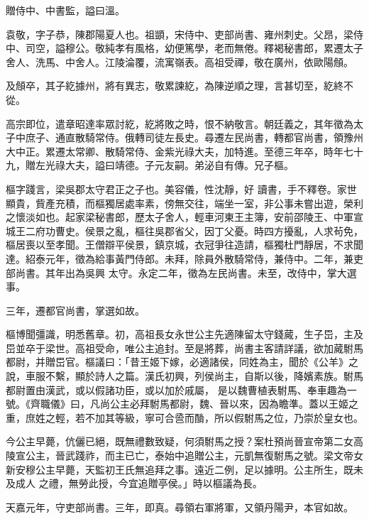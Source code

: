 \begin{pinyinscope}
 贈侍中、中書監，謚曰溫。



 袁敬，字子恭，陳郡陽夏人也。祖顗，宋侍中、吏部尚書、雍州刺史。父昂，梁侍中、司空，謚穆公。敬純孝有風格，幼便篤學，老而無倦。釋褐秘書郎，累遷太子舍人、洗馬、中舍人。江陵淪覆，流寓嶺表。高祖受禪，敬在廣州，依歐陽頠。



 及頠卒，其子紇據州，將有異志，敬累諫紇，為陳逆順之理，言甚切至，紇終不從。



 高宗即位，遣章昭達率眾討紇，紇將敗之時，恨不納敬言。朝廷義之，其年徵為太子中庶子、通直散騎常侍。俄轉司徒左長史。尋遷左民尚書，轉都官尚書，領豫州大中正。累遷太常卿、散騎常侍、金紫光祿大夫，加特進。至德三年卒，時年七十九，贈左光祿大夫，謚曰靖德。子元友嗣。弟泌自有傳。兄子樞。



 樞字踐言，梁吳郡太守君正之子也。美容儀，性沈靜，好
 讀書，手不釋卷。家世顯貴，貲產充積，而樞獨居處率素，傍無交往，端坐一室，非公事未嘗出遊，榮利之懷淡如也。起家梁秘書郎，歷太子舍人，輕車河東王主簿，安前邵陵王、中軍宣城王二府功曹史。侯景之亂，樞往吳郡省父，因丁父憂。時四方擾亂，人求茍免，樞居喪以至孝聞。王僧辯平侯景，鎮京城，衣冠爭往造請，樞獨杜門靜居，不求聞達。紹泰元年，徵為給事黃門侍郎。未拜，除員外散騎常侍，兼侍中。二年，兼吏部尚書。其年出為吳興
 太守。永定二年，徵為左民尚書。未至，改侍中，掌大選事。



 三年，遷都官尚書，掌選如故。



 樞博聞彊識，明悉舊章。初，高祖長女永世公主先適陳留太守錢蕆，生子岊，主及岊並卒于梁世。高祖受命，唯公主追封。至是將葬，尚書主客請詳議，欲加蕆駙馬都尉，并贈岊官。樞議曰：「昔王姬下嫁，必適諸侯，同姓為主，聞於《公羊》之說，車服不繫，顯於詩人之篇。漢氏初興，列侯尚主，自斯以後，降嬪素族。駙馬都尉置由漢武，或以假諸功臣，或以加於戚屬，
 是以魏曹植表駙馬、奉車趣為一號。《齊職儀》曰，凡尚公主必拜駙馬都尉，魏、晉以來，因為瞻準。蓋以王姬之重，庶姓之輕，若不加其等級，寧可合巹而酳，所以假駙馬之位，乃崇於皇女也。



 今公主早薨，伉儷已絕，既無禮數致疑，何須駙馬之授？案杜預尚晉宣帝第二女高陵宣公主，晉武踐祚，而主已亡，泰始中追贈公主，元凱無復駙馬之號。梁文帝女新安穆公主早薨，天監初王氏無追拜之事。遠近二例，足以據明。公主所生，既未及成人
 之禮，無勞此授，今宜追贈亭侯。」時以樞議為長。



 天嘉元年，守吏部尚書。三年，即真。尋領右軍將軍，又領丹陽尹，本官如故。




\end{pinyinscope}
